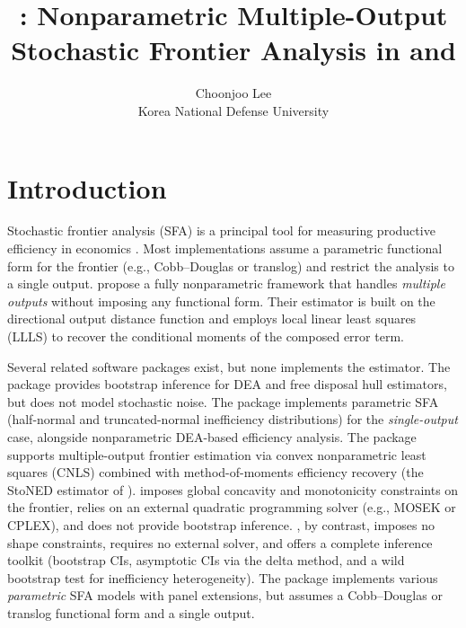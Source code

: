 \documentclass[article]{jss}
\author{Choonjoo Lee\\Korea National Defense University}
\title{\pkg{sw2023}: Nonparametric Multiple-Output Stochastic Frontier
       Analysis in \proglang{Python} and \proglang{Stata}}
\begin{document}

\section[Introduction]{Introduction}
\label{sec:intro}

Stochastic frontier analysis (SFA) is a principal tool for measuring
productive efficiency in economics \citep{SimarWilson2010}.  Most
implementations assume a parametric functional form for the frontier
(e.g., Cobb--Douglas or translog) and restrict the analysis to a single
output.  \citet{SimarWilson2023} propose a fully nonparametric framework
that handles \emph{multiple outputs} without imposing any functional form.
Their estimator is built on the directional output distance function and
employs local linear least squares (LLLS) to recover the conditional
moments of the composed error term.

Several related software packages exist, but none implements the
\citet{SimarWilson2023} estimator.
The  package  \citep{Wilson2008} provides bootstrap
inference for DEA and free disposal hull estimators, but does not model
stochastic noise.
The  package  \citep{BadunenkoMozharovskyi2016}
implements parametric SFA (half-normal and truncated-normal inefficiency
distributions) for the \emph{single-output} case, alongside nonparametric
DEA-based efficiency analysis.
The  package  \citep{DaiFangLeeKuosmanen2024}
supports multiple-output frontier estimation via convex nonparametric least
squares (CNLS) combined with method-of-moments efficiency recovery
(the StoNED estimator of \citealt{KuosmanenJohnson2010}).
 imposes global concavity and monotonicity constraints on the
frontier, relies on an external quadratic programming solver
(e.g., MOSEK or CPLEX), and does not provide bootstrap inference.
, by contrast, imposes no shape constraints, requires no external
solver, and offers a complete inference toolkit (bootstrap CIs, asymptotic
CIs via the delta method, and a wild bootstrap test for inefficiency
heterogeneity).
The  package  \citep{HoltkampBrummer2017} implements
various \emph{parametric} SFA models with panel extensions, but assumes a
Cobb--Douglas or translog functional form and a single output.
\end{document}
